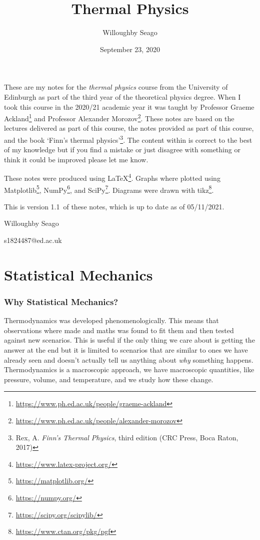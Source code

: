 \documentclass[a4paper]{article}
\author{Willoughby Seago}
\date{September 23, 2020}
\title{Thermal Physics}
\newcommand{\notesVersion}{1.1}
\newcommand{\notesDate}{05/11/2021}
\begin{document}
    \maketitle
    These are my notes for the \textit{thermal physics} course from the University of Edinburgh as part of the third year of the theoretical physics degree.
    When I took this course in the 2020/21 academic year it was taught by Professor Graeme Ackland\footnote{\url{https://www.ph.ed.ac.uk/people/graeme-ackland}} and Professor Alexander Morozov\footnote{\url{https://www.ph.ed.ac.uk/people/alexander-morozov}}.
    These notes are based on the lectures delivered as part of this course, the notes provided as part of this course, and the book `Finn's thermal physics'\footnote{Rex, A. \textit{Finn's Thermal Physics}, third edition (CRC Press, Boca Raton, 2017)}.
    The content within is correct to the best of my knowledge but if you find a mistake or just disagree with something or think it could be improved please let me know.
    
    These notes were produced using \LaTeX\footnote{\url{https://www.latex-project.org/}}.
    Graphs where plotted using Matplotlib\footnote{\url{https://matplotlib.org/}}, NumPy\footnote{\url{https://numpy.org/}}, and SciPy\footnote{\url{https://scipy.org/scipylib/}}.
    Diagrams were drawn with tikz\footnote{\url{https://www.ctan.org/pkg/pgf}}.
    
    This is version \notesVersion~of these notes, which is up to date as of \notesDate.
    \begin{flushright}
        Willoughby Seago
        
        s1824487@ed.ac.uk
    \end{flushright}
    \clearpage
    \tableofcontents
    \listoffigures
    \listoftables
    \printglossary[type=\acronymtype, title=Acronyms, style=long]
    \clearpage
    \begingroup
    \let\clearpage\relax  %
    
    \endgroup
    
    
    \part{Statistical Mechanics}
    \section{Why Statistical Mechanics?}
    Thermodynamics was developed phenomenologically.
    This means that observations where made and maths was found to fit them and then tested against new scenarios.
    This is useful if the only thing we care about is getting the answer at the end but it is limited to scenarios that are similar to ones we have already seen and doesn't actually tell us anything about \emph{why} something happens.
    Thermodynamics is a macroscopic approach, we have macroscopic quantities, like pressure, volume, and temperature, and we study how these change.
    
\end{document}
